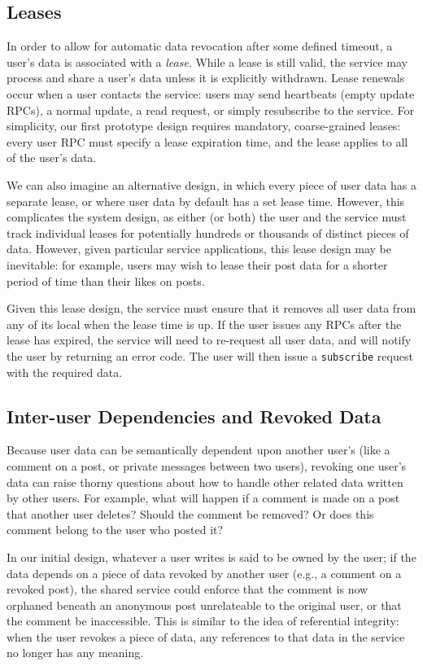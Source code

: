 \documentclass[letterpaper,twocolumn,10pt]{article}
\begin{document}
\subsection{Leases}
\label{sec:leases}
In order to allow for automatic data revocation after some defined timeout, 
a user's data is associated with a \emph{lease}.
While a lease is still valid, the service may process and share a user's data
unless it is explicitly withdrawn. Lease renewals occur when a user contacts the
service: users may send heartbeats (empty update RPCs), a normal update, a read request,
or simply resubscribe to the service.
For simplicity, our first prototype design requires mandatory, coarse-grained leases: every user RPC 
must specify a lease expiration time, and the lease applies to all of the user's data.

We can also imagine an alternative design, in which every piece of user data has a separate lease, or
where user data by default has a set lease time. However, this complicates the system design, as either (or both)
the user and the service must track individual leases for potentially hundreds or thousands of distinct pieces
of data. However, given particular service applications, this lease design may be inevitable: for example, users may wish to 
lease their post data for a shorter period of time than their likes on posts.

Given this lease design, the service must ensure that it removes all user data 
from any of its local when the lease time is up.
If the user issues any RPCs after the lease has expired, 
the service will need to re-request all user data,
and will notify the user by returning an error code.
The user will then issue a \texttt{subscribe} request with the required data.

\subsection{Inter-user Dependencies and Revoked Data}
Because user data can be semantically dependent upon another user's (like a comment on a post, or private
messages between two users),
revoking one user's data can raise thorny questions about how to handle other related data
written by other users.
For example, what will happen if a comment is made on a post that another user deletes? Should the comment be removed? Or does this comment belong to the user who posted it? 

In our initial design, whatever a user writes is said to be owned by the user; if the 
data depends on a piece of data revoked by another user (e.g., a comment on a revoked post),
the shared service could enforce that the comment is now orphaned beneath an anonymous post
unrelateable to the original user, or that the comment be inaccessible.
This is similar to the idea of referential integrity: when the user revokes 
a piece of data, any references to that data in the service no longer has any meaning.
\end{document}
